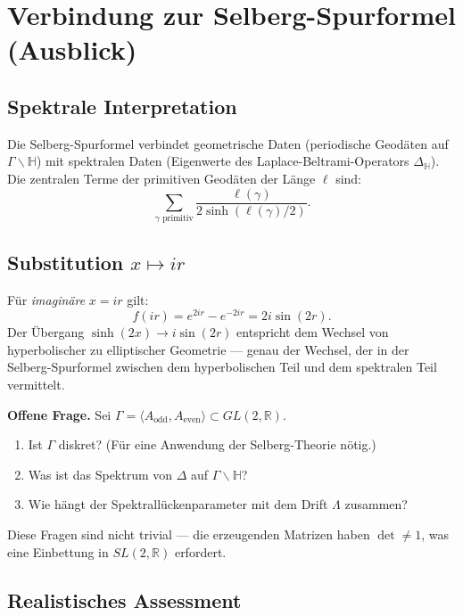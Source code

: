 \documentclass[12pt,a4paper]{article}
\newcommand{\sinh}{\operatorname{sinh}}
\newcommand{\R}{\mathbb{R}}
\begin{document}
\section{Verbindung zur Selberg-Spurformel (Ausblick)}

\subsection{Spektrale Interpretation}

Die Selberg-Spurformel verbindet geometrische Daten (periodische Geodäten
auf $\Gamma\backslash\mathbb{H}$) mit spektralen Daten (Eigenwerte des
Laplace-Beltrami-Operators $\Delta_{\mathbb{H}}$). Die zentralen Terme
der primitiven Geodäten der Länge $\ell$ sind:
\[
  \sum_{\gamma \text{ primitiv}} \frac{\ell(\gamma)}{2\sinh(\ell(\gamma)/2)}.
\]

\subsection{Substitution $x \mapsto ir$}

Für \emph{imaginäre} $x = ir$ gilt:
\[
  f(ir) = e^{2ir} - e^{-2ir} = 2i\sin(2r).
\]
Der Übergang $\sinh(2x) \to i\sin(2r)$ entspricht dem Wechsel von
hyperbolischer zu elliptischer Geometrie — genau der Wechsel,
der in der Selberg-Spurformel zwischen dem hyperbolischen Teil und
dem spektralen Teil vermittelt.

\begin{tcolorbox}[lücke]
\textbf{Offene Frage.}
Sei $\Gamma = \langle A_{\text{odd}}, A_{\text{even}}\rangle \subset GL(2,\R)$.
\begin{enumerate}[label=(\roman*)]
  \item Ist $\Gamma$ diskret? (Für eine Anwendung der Selberg-Theorie nötig.)
  \item Was ist das Spektrum von $\Delta$ auf $\Gamma\backslash\mathbb{H}$?
  \item Wie hängt der Spektrallückenparameter mit dem Drift $\Lambda$ zusammen?
\end{enumerate}
Diese Fragen sind nicht trivial — die erzeugenden Matrizen haben
$\det \ne 1$, was eine Einbettung in $SL(2,\R)$ erfordert.
\end{tcolorbox}

\subsection{Realistisches Assessment}
\end{document}
